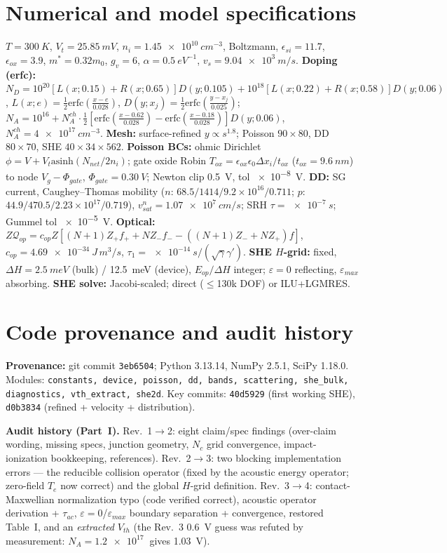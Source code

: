 \documentclass[11pt]{article}
\newcommand{\eps}{\varepsilon}
\begin{document}
\section{Numerical and model specifications}\label{sec:specs}
$T=\SI{300}{K}$, $V_t=\SI{25.85}{mV}$, $n_i=\SI{1.45e10}{cm^{-3}}$, Boltzmann,
$\epsilon_{si}=11.7$, $\epsilon_{ox}=3.9$, $m^*=0.32m_0$, $g_v=6$, $\alpha=\SI{0.5}{eV^{-1}}$,
$v_s=\SI{9.04e3}{m/s}$. \textbf{Doping (erfc):} $N_D=10^{20}[L(x;0.15)+R(x;0.65)]D(y;0.105)+
10^{18}[L(x;0.22)+R(x;0.58)]D(y;0.06)$, $L(x;e)=\tfrac12\mathrm{erfc}(\tfrac{x-e}{0.028})$,
$D(y;x_j)=\tfrac12\mathrm{erfc}(\tfrac{y-x_j}{0.025})$; $N_A=10^{16}+N_A^{ch}\cdot\tfrac12
[\mathrm{erfc}(\tfrac{x-0.62}{0.028})-\mathrm{erfc}(\tfrac{x-0.18}{0.028})]D(y;0.06)$,
$N_A^{ch}=\SI{4e17}{cm^{-3}}$. \textbf{Mesh:} surface-refined $y\propto s^{1.8}$; Poisson
$90\times80$, DD $80\times70$, SHE $40\times34\times562$. \textbf{Poisson BCs:} ohmic
Dirichlet $\phi=V+V_t\mathrm{asinh}(N_{net}/2n_i)$; gate oxide Robin $T_{ox}=\epsilon_{ox}
\epsilon_0\Delta x_i/t_{ox}$ ($t_{ox}=\SI{9.6}{nm}$) to node $V_g-\Phi_{gate}$,
$\Phi_{gate}=\SI{0.30}{V}$; Newton clip \SI{0.5}{V}, tol \SI{e-8}{V}. \textbf{DD:} SG current,
Caughey--Thomas mobility ($n$: $68.5/1414/9.2{\times}10^{16}/0.711$; $p$: $44.9/470.5/2.23
{\times}10^{17}/0.719$), $v_{sat}^n=\SI{1.07e7}{cm/s}$; SRH $\tau=\SI{e-7}{s}$; Gummel tol
\SI{e-5}{V}. \textbf{Optical:} $Z\mathcal{Q}_{op}=c_{op}Z[(N{+}1)Z_+f_++NZ_-f_--((N{+}1)Z_-
+NZ_+)f]$, $c_{op}=\SI{4.69e-34}{J\,m^3/s}$, $\tau_1=\SI{e-14}{s}/(\sqrt\gamma\gamma')$.
\textbf{SHE $H$-grid:} fixed, $\Delta H=\SI{2.5}{meV}$ (bulk) / \SI{12.5}{meV} (device),
$E_{op}/\Delta H$ integer; $\eps=0$ reflecting, $\eps_{max}$ absorbing. \textbf{SHE solve:}
Jacobi-scaled; direct ($\le$130k DOF) or ILU+LGMRES.

\section{Code provenance and audit history}\label{sec:history}
\textbf{Provenance:} git commit \texttt{3eb6504}; Python 3.13.14, NumPy 2.5.1, SciPy 1.18.0.
Modules: \texttt{constants, device, poisson, dd, bands, scattering, she\_bulk, diagnostics,
vth\_extract, she2d}. Key commits: \texttt{40d5929} (first working SHE), \texttt{d0b3834}
(refined + velocity + distribution).

\smallskip\noindent\textbf{Audit history (Part~I).} Rev.~1$\to$2: eight claim/spec findings
(over-claim wording, missing specs, junction geometry, $N_c$ grid convergence, impact-
ionization bookkeeping, references). Rev.~2$\to$3: two blocking implementation errors --- the
reducible collision operator (fixed by the acoustic energy operator; zero-field $T_e$ now
correct) and the global $H$-grid definition. Rev.~3$\to$4: contact-Maxwellian normalization
typo (code verified correct), acoustic operator derivation + $\tau_{ac}$, $\eps=0$/$\eps_{max}$
boundary separation + convergence, restored Table~I, and an \emph{extracted} $V_{th}$ (the
Rev.~3 $0.6$~V guess was refuted by measurement: $N_A=\SI{1.2e17}{}$ gives \SI{1.03}{V}).
\end{document}
